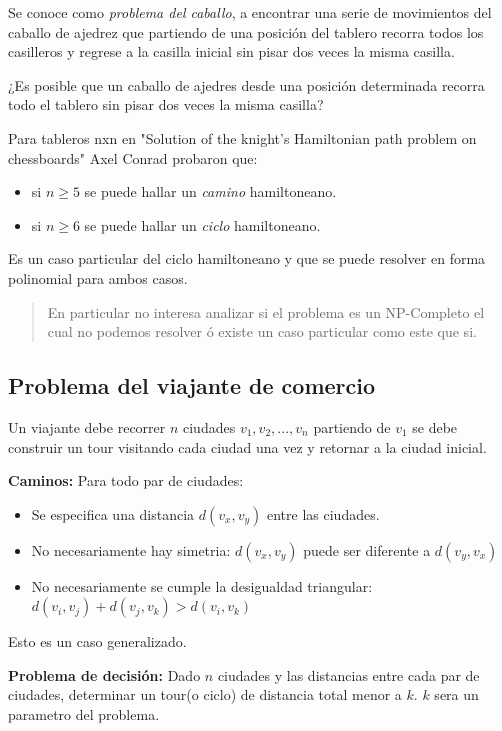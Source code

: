 \documentclass{article}
\begin{document}
Se conoce como \textit{problema del caballo}, a encontrar una serie de movimientos del caballo de ajedrez
que partiendo de una posición del tablero recorra todos los casilleros y regrese a la casilla inicial 
sin pisar dos veces la misma casilla. 

¿Es posible que un caballo de ajedres desde una posición determinada recorra todo el tablero sin 
pisar dos veces la misma casilla?

Para tableros nxn en "Solution of the knight’s Hamiltonian path problem on chessboards" Axel Conrad 
probaron que:

\begin{itemize}
    \item si \(n \geq 5\) se puede hallar un \textit{camino} hamiltoneano.
    \item si \(n \geq 6\) se puede hallar un \textit{ciclo} hamiltoneano.
\end{itemize}

Es un caso particular del ciclo hamiltoneano y que se puede resolver en forma polinomial para ambos casos.

\begin{quote}
En particular no interesa analizar si el problema es un NP-Completo el cual no podemos resolver ó existe 
un caso particular como este que si.
\end{quote}

\newpage
\subsection{Problema del viajante de comercio}
Un viajante debe recorrer \(n\) ciudades \(v_1,v_2,...,v_n\) partiendo de \(v_1\) se debe construir
un tour visitando cada ciudad una vez y retornar a la ciudad inicial.

\textbf{Caminos:} Para todo par de ciudades: 
\begin{itemize}
    \item Se especifica una distancia \(d(v_x,v_y)\) entre las ciudades.
    \item No necesariamente hay simetria: \(d(v_x,v_y)\) puede ser diferente a \(d(v_y,v_x)\)
    \item No necesariamente se cumple la desigualdad triangular: \(d(v_i,v_j)+d(v_j,v_k)>d(v_i,v_k)\)
\end{itemize}
Esto es un caso generalizado.

\textbf{Problema de decisión:} Dado \(n\) ciudades y las distancias entre cada par de ciudades, 
determinar un tour(o ciclo) de distancia total menor a \(k\). \(k\) sera un parametro del problema.
\end{document}
